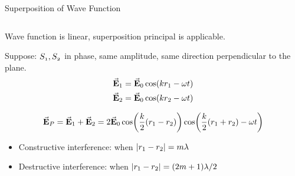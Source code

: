 \documentclass{beamer}
\begin{document}
\begin{frame}{Superposition of Wave Function}
\begin{columns}
        \begin{column}{.9\linewidth}
            Wave function is linear, superposition principal is applicable. 
    
    Suppose: $\mathnormal{S_1, S_2}$ in phase, same amplitude, same direction perpendicular to the plane.
    \begin{equation}
        \begin{split}
            \va{E}_1 &= \va{E}_0 \cos(kr_1-\omega t) \\
            \va{E}_2 &= \va{E}_0 \cos(kr_2-\omega t)
        \end{split}
    \end{equation}

    \begin{equation}
        \va{E}_P = \va{E}_1 + \va{E}_2 = 2\va{E}_0 \cos(\frac{k}{2}(r_1-r_2))\cos(\frac{k}{2}(r_1+r_2)-\omega t)
    \end{equation}

    \begin{itemize}
        \item Constructive interference: when $\abs{r_1-r_2}=m\lambda$
        \item Destructive interference: when $\abs{r_1-r_2}=(2m+1)\lambda/2$
    \end{itemize}
        \end{column}
    \end{columns}
    
\end{frame}
\end{document}

